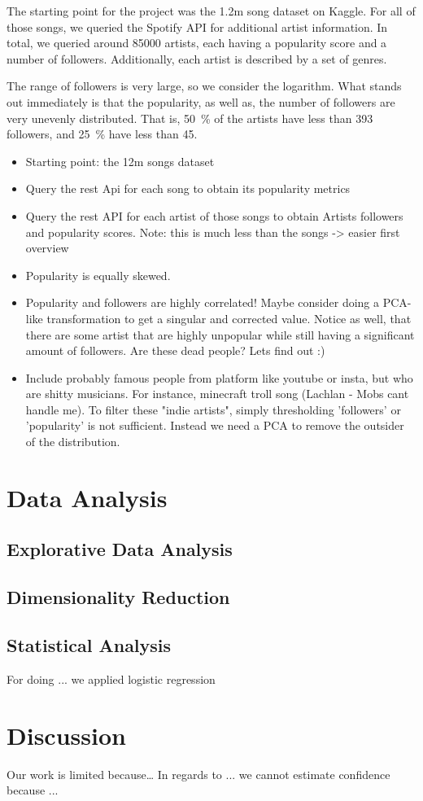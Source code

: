 \documentclass{article}
\begin{document}
The starting point for the project was the 1.2m song dataset on Kaggle. 
For all of those songs, we queried the Spotify API for additional artist information. 
In total, we queried around \num[]{85 000} artists, each having a popularity score and a number of followers. 
Additionally, each artist is described by a set of genres.

The range of followers is very large, so we consider the logarithm.
What stands out immediately is that the popularity, as well as, the number of followers are very unevenly distributed. 
That is, \SI{50}{\percent} of the artists have less than 393 followers, and \SI{25}{\percent} have less than 45. 



\begin{itemize}
  \item Starting point: the 12m songs dataset
  \item Query the rest Api for each song to obtain its popularity metrics
  \item Query the rest API for each artist of those songs to obtain Artists followers and popularity scores. Note: this is much less than the songs -> easier first overview
  \item Popularity is equally skewed.
  \item Popularity and followers are highly correlated! Maybe consider doing a PCA-like transformation to get a singular and corrected value. Notice as well, that there are some artist that are highly unpopular while still having a significant amount of followers. Are these dead people? Lets find out :)
  \item Include probably famous people from platform like youtube or insta, but who are shitty musicians. For instance, minecraft troll song (Lachlan - Mobs cant handle me).
  To filter these "indie artists", simply thresholding 'followers' or 'popularity' is not sufficient. Instead we need a PCA to remove the outsider of the distribution.
\end{itemize}

\section{Data Analysis}

\subsection{Explorative Data Analysis}

\subsection{Dimensionality Reduction}

\subsection{Statistical Analysis}
For doing ... we applied logistic regression

\section{Discussion}
Our work is limited because\dots
In regards to ... we cannot estimate confidence because ...
\end{document}

